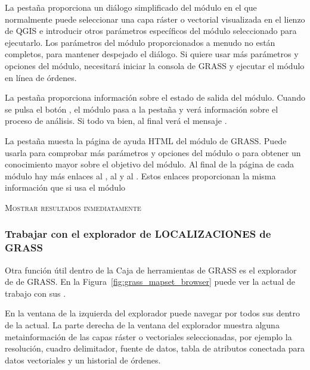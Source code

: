
La pestaña  proporciona un diálogo simplificado del módulo en el que normalmente puede seleccionar una 
capa ráster o vectorial visualizada en el lienzo de QGIS e introducir otros parámetros específicos del módulo seleccionado 
para ejecutarlo. Los parámetros del módulo proporcionados a menudo no están completos, para mantener despejado el diálogo.
Si quiere usar más parámetros y opciones del módulo, necesitará iniciar la consola de GRASS y ejecutar el módulo en línea
de órdenes.


La pestaña  proporciona información sobre el estado de salida del módulo. Cuando se pulsa el botón , 
el módulo pasa a la pestaña  y verá información sobre el proceso de análisis. Si todo va bien, al final verá 
el mensaje .


La pestaña  muesta la página de ayuda HTML del módulo de GRASS. Puede usarla para comprobar más parámetros y 
opciones del módulo o para obtener un conocimiento mayor sobre el objetivo del módulo. Al final de la página de cada módulo 
hay más enlaces al , al  y al . 
Estos enlaces proporcionan la misma información que si usa el módulo  

\begin{Tip}\caption{\textsc{Mostrar resultados inmediatamente}}
\end{Tip} 

\subsubsection{Trabajar con el explorador de LOCALIZACIONES de GRASS} 

Otra función útil dentro de la Caja de herramientas de GRASS es el explorador de 
 de GRASS. En la Figura~\ref{fig:grass_mapset_browser} puede ver la  actual de trabajo con sus .

En la ventana de la izquierda del explorador puede navegar por todos sus  
dentro de la  actual. La parte derecha de la ventana del explorador muestra alguna metainformación 
de las capas ráster o vectoriales seleccionadas, por ejemplo la resolución, cuadro delimitador, fuente de datos, tabla 
de atributos conectada para datos vectoriales y un historial de órdenes.

